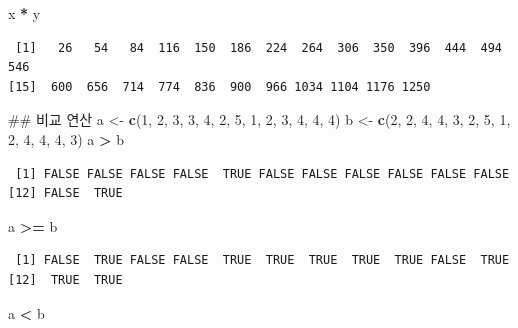 \documentclass[11pt,a4paper]{book}
\newenvironment{Shaded}{\begin{snugshade}}{\end{snugshade}}
\newcommand{\KeywordTok}[1]{\textcolor[rgb]{0.13,0.29,0.53}{\textbf{#1}}}
\newcommand{\DecValTok}[1]{\textcolor[rgb]{0.00,0.00,0.81}{#1}}
\newcommand{\StringTok}[1]{\textcolor[rgb]{0.31,0.60,0.02}{#1}}
\newcommand{\OperatorTok}[1]{\textcolor[rgb]{0.81,0.36,0.00}{\textbf{#1}}}
\newcommand{\NormalTok}[1]{#1}
\theoremstyle{definition}
\theoremstyle{definition}
\theoremstyle{definition}
\theoremstyle{remark}
\begin{document}
\begin{Shaded}
\begin{Highlighting}[]
\NormalTok{x }\OperatorTok{*}\StringTok{ }\NormalTok{y}
\end{Highlighting}
\end{Shaded}

\begin{verbatim}
 [1]   26   54   84  116  150  186  224  264  306  350  396  444  494  546
[15]  600  656  714  774  836  900  966 1034 1104 1176 1250
\end{verbatim}

\begin{Shaded}
\begin{Highlighting}[]
\NormalTok{## 비교 연산}
\NormalTok{a <-}\StringTok{ }\KeywordTok{c}\NormalTok{(}\DecValTok{1}\NormalTok{, }\DecValTok{2}\NormalTok{, }\DecValTok{3}\NormalTok{, }\DecValTok{3}\NormalTok{, }\DecValTok{4}\NormalTok{, }\DecValTok{2}\NormalTok{, }\DecValTok{5}\NormalTok{, }\DecValTok{1}\NormalTok{, }\DecValTok{2}\NormalTok{, }\DecValTok{3}\NormalTok{, }\DecValTok{4}\NormalTok{, }\DecValTok{4}\NormalTok{, }\DecValTok{4}\NormalTok{)}
\NormalTok{b <-}\StringTok{ }\KeywordTok{c}\NormalTok{(}\DecValTok{2}\NormalTok{, }\DecValTok{2}\NormalTok{, }\DecValTok{4}\NormalTok{, }\DecValTok{4}\NormalTok{, }\DecValTok{3}\NormalTok{, }\DecValTok{2}\NormalTok{, }\DecValTok{5}\NormalTok{, }\DecValTok{1}\NormalTok{, }\DecValTok{2}\NormalTok{, }\DecValTok{4}\NormalTok{, }\DecValTok{4}\NormalTok{, }\DecValTok{4}\NormalTok{, }\DecValTok{3}\NormalTok{)}
\NormalTok{a }\OperatorTok{>}\StringTok{ }\NormalTok{b}
\end{Highlighting}
\end{Shaded}

\begin{verbatim}
 [1] FALSE FALSE FALSE FALSE  TRUE FALSE FALSE FALSE FALSE FALSE FALSE
[12] FALSE  TRUE
\end{verbatim}

\begin{Shaded}
\begin{Highlighting}[]
\NormalTok{a }\OperatorTok{>=}\StringTok{ }\NormalTok{b}
\end{Highlighting}
\end{Shaded}

\begin{verbatim}
 [1] FALSE  TRUE FALSE FALSE  TRUE  TRUE  TRUE  TRUE  TRUE FALSE  TRUE
[12]  TRUE  TRUE
\end{verbatim}

\begin{Shaded}
\begin{Highlighting}[]
\NormalTok{a }\OperatorTok{<}\StringTok{ }\NormalTok{b}
\end{Highlighting}
\end{Shaded}
\end{document}
